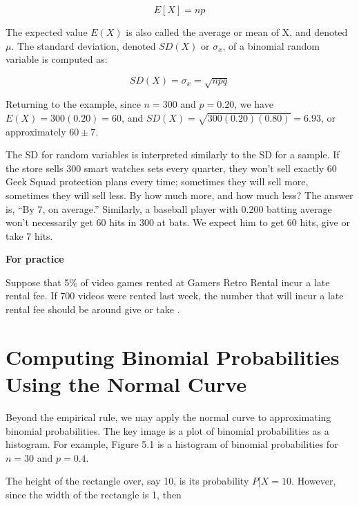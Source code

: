 \documentclass[11pt, chapterprefix=true]{scrbook}\usepackage[]{graphicx}\usepackage[]{color}
\begin{document}
\begin{equation*}
E[ X ] = np
\end{equation*}

The expected value $E(X)$ is also called the average or mean of X, and denoted $\mu$.  The standard deviation, denoted $SD(X)$ or $\sigma_x$, of a binomial random variable is computed as:

\begin{equation*}
SD(X) = \sigma_x = \sqrt{npq}
\end{equation*}

Returning to the example, since $n = 300$ and $p = 0.20$, we have $E(X) = 300(0.20) = 60$, and $SD(X) = \sqrt{300(0.20)(0.80)} = 6.93$, or approximately $60 \pm 7$.

The SD for random variables is interpreted similarly to the SD for a sample.  If the store sells 300 smart watches sets every quarter, they won't sell exactly 60 Geek Squad protection plans every time; sometimes they will sell more, sometimes they will sell less.   By how much more, and how much less?  The answer is, ``By 7, on average.''   Similarly, a baseball player with 0.200 batting average won't necessarily get 60 hits in 300 at bats.  We expect him to get 60 hits, give or take 7 hits.

\begin{minipage}[ht]{3cm}

\textbf{For practice}
\end{minipage}
\begin{minipage}[ht]{12cm}

Suppose that 5\% of video games rented at Gamers Retro Rental incur a late rental fee. If 700 videos were rented last week, the number that will incur a late rental fee should be around \underline{\phantom{xxxxxxxxxx}} give or take \underline{\phantom{xxxxxxxxxx}}.

\end{minipage}

\section{Computing Binomial Probabilities Using the Normal Curve}

Beyond the empirical rule, we may apply the normal curve to approximating binomial probabilities.  The key image is a plot of binomial probabilities as a histogram.  For example, Figure 5.1 is a histogram of binomial probabilities for $n = 30$ and $p = 0.4$.

The height of the rectangle over, say 10, is its probability $P[X = 10$.  However, since the width of the rectangle is 1, then
\end{document}
